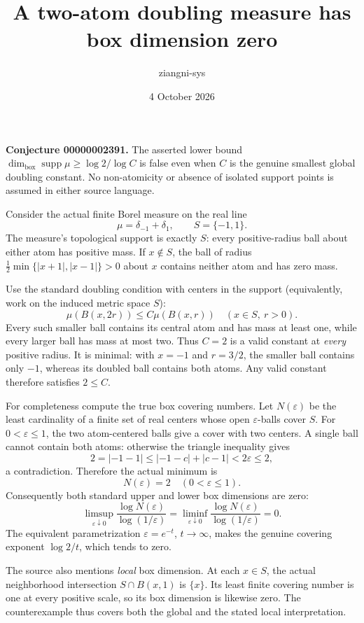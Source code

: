 \documentclass[11pt]{article}
\title{A two-atom doubling measure has box dimension zero}
\author{ziangni-sys}
\date{4 October 2026}
\begin{document}
\maketitle
\noindent\textbf{Conjecture 00000002391.} The asserted lower bound
\(\dim_{\mathrm{box}}\operatorname{supp}\mu\ge\log 2/\log C\)
is false even when \(C\) is the genuine smallest global doubling constant. No non-atomicity or absence of isolated support points is assumed in either source language.

Consider the actual finite Borel measure on the real line
\[
 \mu=\delta_{-1}+\delta_1,\qquad S=\{-1,1\}.
\]
The measure's topological support is exactly \(S\): every positive-radius ball about either atom has positive mass. If \(x\notin S\), the ball of radius
\(\frac12\min\{|x+1|,|x-1|\}>0\) about \(x\) contains neither atom and has zero mass.

Use the standard doubling condition with centers in the support (equivalently, work on the induced metric space \(S\)):
\[
 \mu(B(x,2r))\le C\mu(B(x,r))\quad(x\in S,\ r>0).
\]
Every such smaller ball contains its central atom and has mass at least one, while every larger ball has mass at most two. Thus \(C=2\) is a valid constant at \emph{every} positive radius. It is minimal: with \(x=-1\) and \(r=3/2\), the smaller ball contains only \(-1\), whereas its doubled ball contains both atoms. Any valid constant therefore satisfies \(2\le C\).

For completeness compute the true box covering numbers. Let \(N(\varepsilon)\) be the least cardinality of a finite set of real centers whose open \(\varepsilon\)-balls cover \(S\). For \(0<\varepsilon\le1\), the two atom-centered balls give a cover with two centers. A single ball cannot contain both atoms: otherwise the triangle inequality gives
\[
 2=|-1-1|\le|-1-c|+|c-1|<2\varepsilon\le2,
\]
a contradiction. Therefore the actual minimum is
\[
 N(\varepsilon)=2\quad(0<\varepsilon\le1).
\]
Consequently both standard upper and lower box dimensions are zero:
\[
 \limsup_{\varepsilon\downarrow0}
 \frac{\log N(\varepsilon)}{\log(1/\varepsilon)}
 =\liminf_{\varepsilon\downarrow0}
 \frac{\log N(\varepsilon)}{\log(1/\varepsilon)}=0.
\]
The equivalent parametrization \(\varepsilon=e^{-t}\), \(t\to\infty\), makes the genuine covering exponent \(\log2/t\), which tends to zero.

The source also mentions \emph{local} box dimension. At each \(x\in S\), the actual neighborhood intersection \(S\cap B(x,1)\) is \(\{x\}\). Its least finite covering number is one at every positive scale, so its box dimension is likewise zero. The counterexample thus covers both the global and the stated local interpretation.
\end{document}
